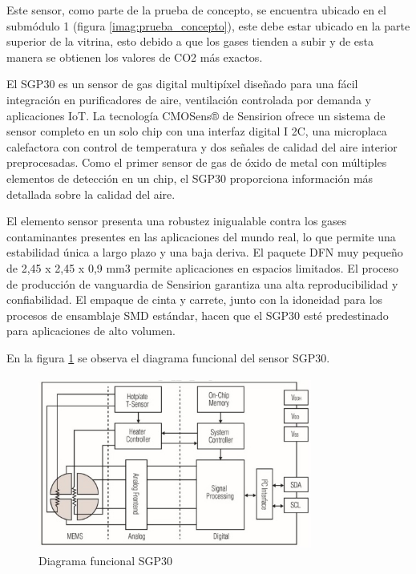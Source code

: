Este sensor, como parte de la prueba de concepto, se encuentra ubicado en el submódulo 1 (figura \ref{imag:prueba_concepto}), este debe estar ubicado en la parte superior de la vitrina, esto debido a que los gases tienden a subir \cite{PorQueLlamaa} y de esta manera se obtienen los valores de CO2 más exactos.

El SGP30 es un sensor de gas digital multipíxel diseñado para una fácil integración en purificadores de aire, ventilación controlada por demanda y aplicaciones IoT. La tecnología CMOSens® de Sensirion ofrece un sistema de sensor completo en un solo chip con una interfaz digital I 2C, una microplaca calefactora con control de temperatura y dos señales de calidad del aire interior preprocesadas. Como el primer sensor de gas de óxido de metal con múltiples elementos de detección en un chip, el SGP30 proporciona información más detallada sobre la calidad del aire.

El elemento sensor presenta una robustez inigualable contra los gases contaminantes presentes en las aplicaciones del mundo real, lo que permite una estabilidad única a largo plazo y una baja deriva. El paquete DFN muy pequeño de 2,45 x 2,45 x 0,9 mm3 permite aplicaciones en espacios limitados. El proceso de producción de vanguardia de Sensirion garantiza una alta reproducibilidad y confiabilidad. El empaque de cinta y carrete, junto con la idoneidad para los procesos de ensamblaje SMD estándar, hacen que el SGP30 esté predestinado para aplicaciones de alto volumen.

En la figura \ref{imag:diagrama_funcional} se observa el diagrama funcional del sensor SGP30.

\begin{figure}[H]
    \centering
    \includegraphics[width=9cm, height=5.7cm]{imagenes/diagrama_funcional_SGP30.jpg}
    \caption{Diagrama funcional SGP30}
    \label{imag:diagrama_funcional}
 \end{figure}


